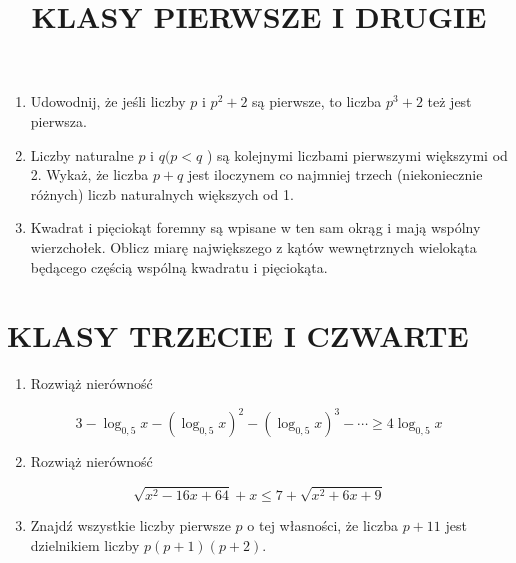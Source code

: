 \documentclass[10pt]{article}
\title{KLASY PIERWSZE I DRUGIE }
\author{}
\date{}
\begin{document}
\maketitle
\begin{enumerate}
  \item Udowodnij, że jeśli liczby \(p\) i \(p^{2}+2\) są pierwsze, to liczba \(p^{3}+2\) też jest pierwsza.
  \item Liczby naturalne \(p\) i \(q(p<q\) ) są kolejnymi liczbami pierwszymi większymi od 2. Wykaż, że liczba \(p+q\) jest iloczynem co najmniej trzech (niekoniecznie różnych) liczb naturalnych większych od 1.
  \item Kwadrat i pięciokąt foremny są wpisane w ten sam okrąg i mają wspólny wierzchołek. Oblicz miarę największego z kątów wewnętrznych wielokąta będącego częścią wspólną kwadratu i pięciokąta.
\end{enumerate}

\section*{KLASY TRZECIE I CZWARTE}
\begin{enumerate}
  \item Rozwiąż nierówność
\end{enumerate}

\[
3-\log _{0,5} x-\left(\log _{0,5} x\right)^{2}-\left(\log _{0,5} x\right)^{3}-\cdots \geq 4 \log _{0,5} x
\]

\begin{enumerate}
  \setcounter{enumi}{1}
  \item Rozwiąż nierówność
\end{enumerate}

\[
\sqrt{x^{2}-16 x+64}+x \leq 7+\sqrt{x^{2}+6 x+9}
\]

\begin{enumerate}
  \setcounter{enumi}{2}
  \item Znajdź wszystkie liczby pierwsze \(p\) o tej własności, że liczba \(p+11\) jest dzielnikiem liczby \(p(p+1)(p+2)\).
\end{enumerate}
\end{document}
